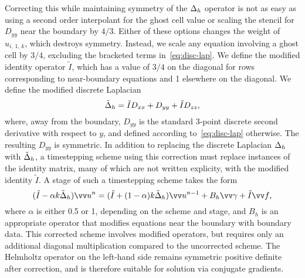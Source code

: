 Correcting this while maintaining symmetry of the $\Delta_h$ operator is not as easy
as using a second order interpolant for the ghost cell value or scaling the stencil for
$D_{yy}$ near the boundary by $4/3$. Either of these options changes the weight of
$u_{i,\,1,\,k}$, which destroys symmetry. Instead, we scale any equation involving a
ghost cell by $3/4$, excluding the bracketed terms in~\eqref{eq:disc-lap}. We define the
modified identity operator $\tilde{I}$, which has a value of $3/4$ on the diagonal for
rows corresponding to near-boundary equations and 1 elsewhere on the diagonal. We define
the modified discrete Laplacian
\begin{equation}\label{eq:mod-disc-lap}
    \tilde{\Delta}_h = \tilde{I}D_{xx} + D_{yy} + \tilde{I}D_{zz},
\end{equation}
where, away from the boundary, $D_{yy}$ is the standard 3-point discrete second
derivative with respect to $y$, and defined according to~\eqref{eq:disc-lap} otherwise.
The resulting $D_{yy}$ is symmetric. In addition to replacing the discrete Laplacian
$\Delta_h$ with $\tilde{\Delta}_h$, a timestepping scheme using this correction
must replace instances of the identity matrix, many of which are not written explicity,
with the modified identity $\tilde{I}$. A stage of such a timestepping scheme takes the
form
\begin{equation*}
    (\tilde{I} - \alpha k\tilde{\laplacian}_h)\arr{u}^n = (\tilde{I} + (1-\alpha)k\tilde{\laplacian}_h)\arr{u}^{n-1} + B_h\arr{\gamma} + \tilde{I}\arr{f},
\end{equation*}
where $\alpha$ is either 0.5 or 1, depending on the scheme and stage, and $B_h$ is an
appropriate operator that modifies equations near the boundary with boundary data. This
corrected scheme involves modified operators, but requires only an additional diagonal
multiplication compared to the uncorrected scheme. The Helmholtz operator on the
left-hand side remains symmetric positive definite after correction, and is therefore
suitable for solution via conjugate gradients.

